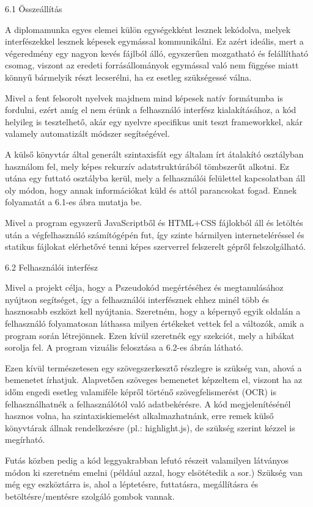 6.1 Összeállítás

A diplomamunka egyes elemei külön egységekként lesznek lekódolva, melyek interfészekkel lesznek képesek egymással kommunikálni. Ez azért ideális, mert a végeredmény egy nagyon kevés fájlból álló, egyszerűen mozgatható és felállítható csomag, viszont az eredeti forrásállományok egymással való nem függése miatt könnyű bármelyik részt lecserélni, ha ez esetleg szükségessé válna.

Mivel a fent felsorolt nyelvek majdnem mind képesek natív formátumba is fordulni, ezért amíg el nem érünk a felhasználó interfész kialakításához, a kód helyileg is tesztelhető, akár egy nyelvre specifikus unit teszt frameworkkel, akár valamely automatizált módszer segítségével.

A külső könyvtár által generált szintaxisfát egy általam írt átalakító osztályban használom fel, mely képes rekurzív adatstruktúrából tömbszerűt alkotni. Ez utána egy futtató osztályba kerül, mely a felhasználói felülettel kapcsolatban áll oly módon, hogy annak információkat küld és attól parancsokat fogad. Ennek folyamatát a 6.1-es ábra mutatja be.

Mivel a program egyszerű JavaScriptből és HTML+CSS fájlokból áll és letöltés után a végfelhasználó számítógépén fut, így szinte bármilyen interneteléréssel és statikus fájlokat elérhetővé tenni képes szerverrel felszerelt gépről felszolgálható.

6.2 Felhasználói interfész

Mivel a projekt célja, hogy a Pszeudokód megértéséhez és megtanulásához nyújtson segítséget, így a felhasználói interfésznek ehhez minél több és hasznosabb eszközt kell nyújtania. Szeretném, hogy a képernyő egyik oldalán a felhasználó folyamatosan láthassa milyen értékeket vettek fel a változók, amik a program során létrejönnek. Ezen kívül szeretnék egy szekciót, mely a hibákat sorolja fel. A program vizuális felosztása a 6.2-es ábrán látható.

Ezen kívül természetesen egy szövegszerkesztő részlegre is szükség van, ahová a bemenetet írhatjuk. Alapvetően szöveges bemenetet képzeltem el, viszont ha az időm engedi esetleg valamiféle képről történő szövegfelismerést (OCR) is felhasználhatnék a felhasználótól való adatbekérésre. A kód megjelenítésénél hasznos volna, ha szintaxiskiemelést alkalmazhatnánk, erre remek külső könyvtárak állnak rendelkezésre (pl.: highlight.js), de szükség szerint kézzel is megírható.

Futás közben pedig a kód leggyakrabban lefutó részeit valamilyen látványos módon ki szeretném emelni (például azzal, hogy elsötétedik a sor.) Szükség van még egy eszköztárra is, ahol a léptetésre, futtatásra, megállításra és betöltésre/mentésre szolgáló gombok vannak.

